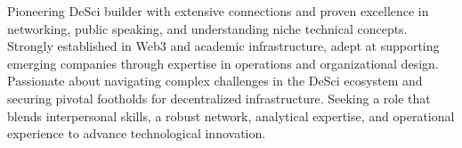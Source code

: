 

\begin{cvparagraph}

Pioneering DeSci builder with extensive connections and proven excellence in networking, public speaking, and understanding niche technical concepts. Strongly established in Web3 and academic infrastructure, adept at supporting emerging companies through expertise in operations and organizational design. Passionate about navigating complex challenges in the DeSci ecosystem and securing pivotal footholds for decentralized infrastructure. Seeking a role that blends interpersonal skills, a robust network, analytical expertise, and operational experience to advance technological innovation.
\end{cvparagraph}
